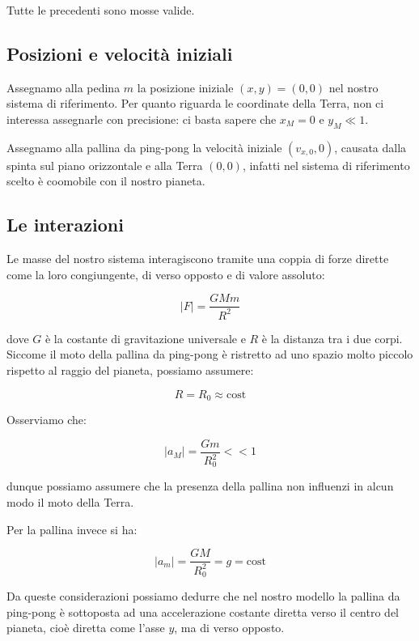 \documentclass{article}
\begin{document}
Tutte le precedenti sono mosse valide.

\subsection{Posizioni e velocità iniziali}
Assegnamo alla pedina $m$ la posizione iniziale $(x,y) = (0,0)$ nel nostro
sistema di riferimento. Per quanto riguarda le coordinate della
Terra, non ci interessa assegnarle con precisione: ci basta sapere
che $x_M = 0$ e $y_M \ll 1$.

Assegnamo alla pallina da ping-pong la velocità iniziale $(v_{x,0},0)$,
causata dalla spinta sul piano orizzontale e alla Terra $(0,0)$, infatti
nel sistema di riferimento scelto è coomobile con il nostro pianeta.

\subsection{Le interazioni}
Le masse del nostro sistema interagiscono tramite una coppia di forze dirette
come la loro congiungente, di verso opposto e di valore assoluto:

\begin{equation}
|F| = \frac{G M m}{R^2}
\end{equation}

dove $G$ è la costante di gravitazione universale e $R$ è la distanza tra i due
corpi. Siccome il moto della pallina da ping-pong è ristretto ad uno spazio
molto piccolo rispetto al raggio del pianeta, possiamo assumere:

\begin{equation}
R = R_0 \approx \mbox{cost}
\end{equation}

Osserviamo che:

\begin{equation}
|a_M| = \frac{Gm}{R_0^2} << 1
\end{equation}

dunque possiamo assumere che la presenza della pallina non influenzi in alcun
modo il moto della Terra.

Per la pallina invece si ha:

\begin{equation}
|a_m| = \frac{GM}{R_0^2} = g = \mbox{cost}
\end{equation}

Da queste considerazioni possiamo dedurre che nel nostro modello
la pallina da ping-pong è sottoposta ad una accelerazione costante
diretta verso il centro del pianeta, cioè diretta come l'asse $y$,
ma di verso opposto.
\end{document}
